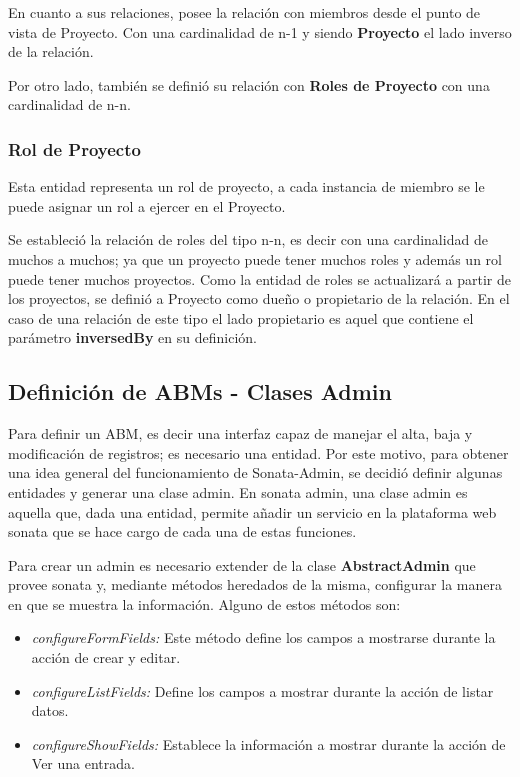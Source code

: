 En cuanto a sus relaciones, posee la relación con miembros desde el punto de vista de Proyecto. Con una cardinalidad de n-1 y siendo \textbf{Proyecto} el lado
inverso de la relación.

Por otro lado, también se definió su relación con \textbf{Roles de Proyecto} con una cardinalidad de n-n.

\subsubsection{Rol de Proyecto}%
\label{ssub:rol_de_proyecto_modelo}
Esta entidad representa un rol de proyecto, a cada instancia de miembro se le puede asignar un rol a ejercer en el Proyecto.

Se estableció la relación de roles del tipo n-n, es decir con una cardinalidad de muchos a muchos; ya que un proyecto puede tener muchos roles y además
un rol puede tener muchos proyectos\@. Como la entidad de roles se actualizará a partir de los proyectos, se definió a Proyecto como dueño o propietario de
la relación. En el caso de una relación de este tipo el lado propietario es aquel que contiene el parámetro \textbf{inversedBy} en su definición.

\subsection{Definición de ABMs - Clases Admin}%
\label{sub:definición_de_abms_clases_admin}

Para definir un ABM, es decir una interfaz capaz de manejar el alta, baja y modificación de registros; es necesario una entidad. Por este motivo, para obtener
una idea general del funcionamiento de Sonata-Admin, se decidió definir algunas entidades y generar una clase admin\@.
En sonata admin, una clase admin es aquella que, dada una entidad, permite añadir un servicio en la plataforma web sonata que se hace cargo de cada una de estas funciones.

Para crear un admin es necesario extender de la clase \textbf{AbstractAdmin} que provee sonata y, mediante métodos heredados de la misma, configurar la manera en
que se muestra la información\@.
Alguno de estos métodos son:

\begin{itemize}
    \item \textit{configureFormFields:} Este método define los campos a mostrarse durante la acción de crear y editar.
    \item \textit{configureListFields:} Define los campos a mostrar durante la acción de listar datos.
    \item \textit{configureShowFields:} Establece la información a mostrar durante la acción de Ver una entrada.
\end{itemize}

